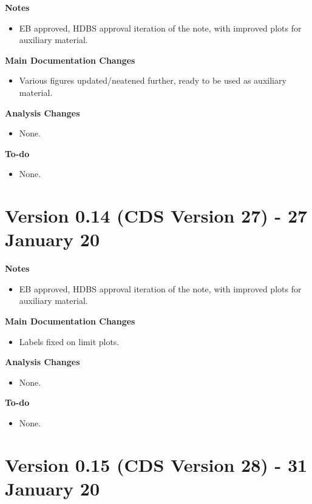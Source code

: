\documentclass[NOTE, atlasdraft=true, texlive=2017, UKenglish]{\ATLASLATEXPATH atlasdoc}
\begin{document}
\textbf{Notes}
\begin{itemize}
\item EB approved, HDBS approval iteration of the note, with improved plots for auxiliary material.
\end{itemize}

\textbf{Main Documentation Changes}
\begin{itemize}
\item Various figures updated/neatened further, ready to be used as auxiliary material.
\end{itemize}

\textbf{Analysis Changes}
\begin{itemize}
\item None.
\end{itemize}

\textbf{To-do}
\begin{itemize}
\item None.
\end{itemize}


\section*{Version 0.14 (CDS Version 27) - 27 January 20}

\textbf{Notes}
\begin{itemize}
\item EB approved, HDBS approval iteration of the note, with improved plots for auxiliary material.
\end{itemize}

\textbf{Main Documentation Changes}
\begin{itemize}
\item Labels fixed on limit plots.
\end{itemize}

\textbf{Analysis Changes}
\begin{itemize}
\item None.
\end{itemize}

\textbf{To-do}
\begin{itemize}
\item None.
\end{itemize}


\section*{Version 0.15 (CDS Version 28) - 31 January 20}
\end{document}
